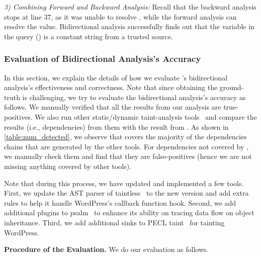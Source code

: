 {\textit{3) Combining Forward and Backward Analysis:}
Recall that the backward analysis stops at line 37, as it was unable to resolve , while the forward analysis can resolve the value. 
Bidirectional analysis successfully finds out that the variable in the query () is a constant string from a trusted source.
}


\subsubsection{Evaluation of Bidirectional Analysis's Accuracy}
\label{appendix:bidir_accuracy}
In this section, we explain the details of how we evaluate \sysname's bidirectional analysis's effectiveness and correctness. 
Note that since obtaining the ground-truth is challenging, we try to evaluate the bidirectional analysis's accuracy as follows.
We manually verified that all the results from our analysis are true-positives. We also run other static/dynamic taint-analysis tools~\cite{taintall, psalm, pecltaint} and compare the results (i.e., dependencies) from them with the result from \sysname. 
As shown in \autoref{table:num_detected}, we observe that \sysname covers the majority of the dependencies chains that are generated by the other tools. For dependencies not covered by \sysname, we manually check them and find that they are false-positives (hence we are not missing anything covered by other tools).

Note that during this process, we have updated and implemented a few tools. First, we update the AST parser of taintless~\cite{taintless} to the new version and add extra rules to help it handle WordPress's callback function hook.
Second, we add additional plugins to psalm~\cite{psalm} to enhance its ability on tracing data flow on object inheritance. Third, we add additional sinks to PECL taint~\cite{pecltaint} for tainting WordPress.


\noindent
{\bf Procedure of the Evaluation.}
We do our evaluation as follows. 

